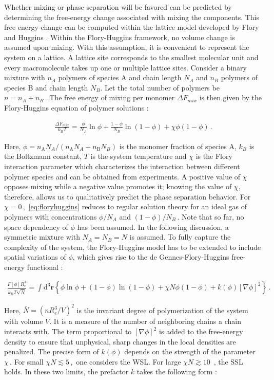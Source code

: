 \documentclass[bachelor,       %
               oneside,        %
               BCOR10mm,       %
               ngerman, english %
               ]{GAUBM}
\begin{document}
Whether mixing or phase separation will be favored can be predicted by determining the free-energy change associated with mixing the components. This free energy-change can be computed within the lattice model developed by Flory and Huggins \cite{Flory42}. Within the Flory-Huggins framework, no volume change is assumed upon mixing. With this assumption, it is convenient to represent the system on a lattice. A lattice site corresponds to the smallest molecular unit and every macromolecule takes up one or multiple lattice sites. Consider a binary mixture with $n_A$ polymers of species A and chain length $N_A$ and $n_B$ polymers of species B and chain length $N_B$. Let the total number of polymers be $n=n_A+n_B\,.$ The free energy of mixing per monomer $\Delta F_{mix}$ is then given by the Flory-Huggins equation of polymer solutions \cite[S. 143]{Rubin03}:

\begin{align}
  \frac{\Delta F_{mix}}{k_BT}=\frac{\phi}{N_A}\ln\phi+\frac{1-\phi}{N_B}\ln(1-\phi)+\chi\phi(1-\phi)\,.
  \label{eq:floryhuggins}
\end{align}

Here, $\phi=n_\mathrm AN_A/(n_\mathrm AN_A+n_\mathrm BN_B)$ is the monomer fraction of species A, $k_B$ is the Boltzmann constant, $T$ is the system temperature and $\chi$ is the Flory interaction parameter which characterizes the interaction between different polymer species and can be obtained from experiments. A positive value of $\chi$ opposes mixing while a negative value promotes it; knowing the value of $\chi$, therefore, allows us to qualitatively predict the phase separation behavior. For $\chi=0\,,$ \autoref{eq:floryhuggins} reduces to regular solution theory for an ideal gas of polymers with concentrations $\phi/N_A$ and $(1-\phi)/N_B\,.$  Note that so far, no space dependency of $\phi$ has been assumed. In the following discussion, a symmetric mixture with $N_A=N_B=N$ is assumed. To fully capture the complexity of the system, the Flory-Huggins model has to be extended to include spatial variations of $\phi$, which gives rise to the de Gennes-Flory-Huggins free-energy functional  \cite{deGennes80, Reister02}:


\begin{align}
  \frac{F[\phi]R_e^3}{k_BT\sqrt{\bar N}}=\int \mathrm{d}^3\mathbf{r}\left\{\phi\ln\phi+(1-\phi)\ln(1-\phi)+\chi N\phi(1-\phi)+k(\phi)[\nabla\phi]^2\right\}\,.
  \label{eq:flory_fctl}
\end{align}

Here, $\bar N=\left(nR_e^3/V\right)^2$ is the invariant degree of polymerization of the system with volume $V$. It is a measure of the number of neighboring chains a chain interacts with. The term proportional to $[\nabla\phi]^2$ is added to the free-energy density to ensure that unphysical, sharp changes in the local densities are penalized. The precise form of $k(\phi)$ depends on the strength of the parameter $\chi\,$. For small $\chi N\lesssim 5\,,$ one considers the \ac{WSL}. For large $\chi N\gtrsim10\,$ \cite{Semenov1996Dec}, the \ac{SSL} holds. In these two limits, the prefactor $k$ takes the following form \cite{Reister02}:
\end{document}

